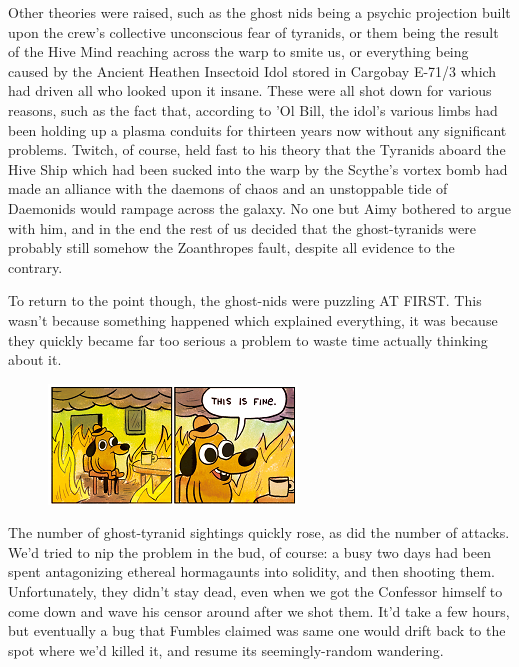 Other theories were raised, such as the ghost nids being a psychic projection built upon the crew's collective unconscious fear of tyranids, or them being the result of the Hive Mind reaching across the warp to smite us, or everything being caused by the Ancient Heathen Insectoid Idol stored in Cargobay E-71/3 which had driven all who looked upon it insane. 
These were all shot down for various reasons, such as the fact that, according to 'Ol Bill, the idol's various limbs had been holding up a plasma conduits for thirteen years now without any significant problems. 
Twitch, of course, held fast to his theory that the Tyranids aboard the Hive Ship which had been sucked into the warp by the Scythe's vortex bomb had made an alliance with the daemons of chaos and an unstoppable tide of Daemonids would rampage across the galaxy. 
No one but Aimy bothered to argue with him, and in the end the rest of us decided that the ghost-tyranids were probably still somehow the Zoanthropes fault, despite all evidence to the contrary.

To return to the point though, the ghost-nids were puzzling AT FIRST. 
This wasn't because something happened which explained everything, it was because they quickly became far too serious a problem to waste time actually thinking about it.

\begin{figure}
	\begin{center}
		\includegraphics[width=\figwidth]{pics/15/14.png}
	\end{center}
\end{figure}
The number of ghost-tyranid sightings quickly rose, as did the number of attacks. 
We'd tried to nip the problem in the bud, of course: 
a busy two days had been spent antagonizing ethereal hormagaunts into solidity, and then shooting them. 
Unfortunately, they didn't stay dead, even when we got the Confessor himself to come down and wave his censor around after we shot them. 
It'd take a few hours, but eventually a bug that Fumbles claimed was same one would drift back to the spot where we'd killed it, and resume its seemingly-random wandering.

